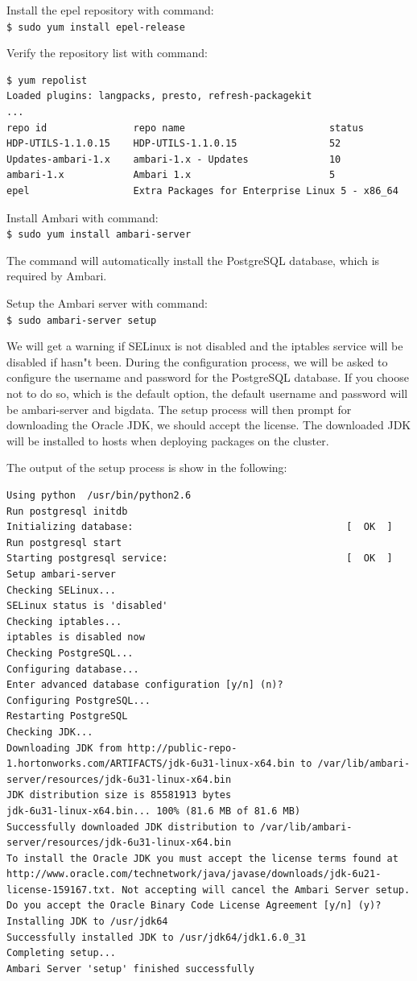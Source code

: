Install the epel repository with command: \\
\verb|$ sudo yum install epel-release |


Verify the repository list with command: 
\lstset{style=bashstyle}
\begin{lstlisting}
$ yum repolist
Loaded plugins: langpacks, presto, refresh-packagekit
...
repo id               repo name                         status
HDP-UTILS-1.1.0.15    HDP-UTILS-1.1.0.15                52
Updates-ambari-1.x    ambari-1.x - Updates              10
ambari-1.x            Ambari 1.x                        5
epel                  Extra Packages for Enterprise Linux 5 - x86_64
\end{lstlisting}

Install Ambari with command: \\
\verb|$ sudo yum install ambari-server|

The command will automatically install the PostgreSQL database, which is required by Ambari.

Setup the Ambari server with command: \\
\verb|$ sudo ambari-server setup|

We will get a warning if SELinux is not disabled and the iptables service will be disabled if hasn"t been. During the configuration process, we will be asked to configure the username and password for the PostgreSQL database. If you choose not to do so, which is the default option, the default username and password will be ambari-server and bigdata. The setup process will then prompt for downloading the Oracle JDK, we should accept the license. The downloaded JDK will be installed to hosts when deploying packages on the cluster.

The output of the setup process is show in the following:
\lstset{style=bashstyle}
\begin{lstlisting}
Using python  /usr/bin/python2.6
Run postgresql initdb
Initializing database:                                     [  OK  ]
Run postgresql start
Starting postgresql service:                               [  OK  ]
Setup ambari-server
Checking SELinux...
SELinux status is 'disabled'
Checking iptables...
iptables is disabled now
Checking PostgreSQL...
Configuring database...
Enter advanced database configuration [y/n] (n)?
Configuring PostgreSQL...
Restarting PostgreSQL
Checking JDK...
Downloading JDK from http://public-repo-1.hortonworks.com/ARTIFACTS/jdk-6u31-linux-x64.bin to /var/lib/ambari-server/resources/jdk-6u31-linux-x64.bin
JDK distribution size is 85581913 bytes
jdk-6u31-linux-x64.bin... 100% (81.6 MB of 81.6 MB)
Successfully downloaded JDK distribution to /var/lib/ambari-server/resources/jdk-6u31-linux-x64.bin
To install the Oracle JDK you must accept the license terms found at http://www.oracle.com/technetwork/java/javase/downloads/jdk-6u21-license-159167.txt. Not accepting will cancel the Ambari Server setup.
Do you accept the Oracle Binary Code License Agreement [y/n] (y)?
Installing JDK to /usr/jdk64
Successfully installed JDK to /usr/jdk64/jdk1.6.0_31
Completing setup...
Ambari Server 'setup' finished successfully
\end{lstlisting}

